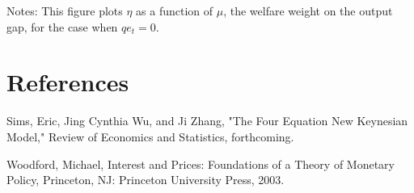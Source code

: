 \documentclass[10pt]{article}
\begin{document}
Notes: This figure plots $\eta$ as a function of $\mu$, the welfare weight on the output gap, for the case when $q e_{t}=0$.

\section*{References}
Sims, Eric, Jing Cynthia Wu, and Ji Zhang, "The Four Equation New Keynesian Model," Review of Economics and Statistics, forthcoming.

Woodford, Michael, Interest and Prices: Foundations of a Theory of Monetary Policy, Princeton, NJ: Princeton University Press, 2003.
\end{document}
